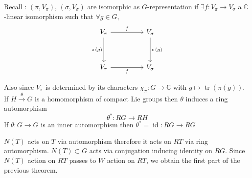 \documentclass[11pt,a4paper]{scrarticle}
\theoremstyle{definition}
\theoremstyle{greenbox}
\newcommand{\C}{\mathbb{C}}
\begin{document}
 Recall : $ (\pi, V_{\pi}) $, $ (\sigma, V_{\sigma}) $ are isomorphic as $ G $-representation if $ \exists f : V_{\pi} \to V_{\sigma} $ a $ \C $-linear isomorphism such that $ \forall g \in G $, 
\[\begin{tikzcd}
	{V_{\pi}} && {V_{\sigma}} \\
	\\
	{V_{\pi}} && {V_{\sigma}}
	\arrow["f", from=1-1, to=1-3]
	\arrow["{\sigma(g)}", from=1-3, to=3-3]
	\arrow["f"', from=3-1, to=3-3]
	\arrow["{\pi(g)}"', from=1-1, to=3-1]
\end{tikzcd}\]

Also since $ V_{\pi} $ is determined by its characters $ \chi_{\pi}: G \to \C $ with $ g \mapsto \operatorname{tr}(\pi(g)) $. If $ H \xrightarrow{\theta} G $ is a homomorphism of compact Lie groups then $ \theta $ induces a ring automorphism 
\[ \theta^{*} : RG \to RH \]
If $ \theta : G \to G $ is an inner automorphism then $ \theta^{*} = \operatorname{id}_{} : RG \to RG$


$ N(T) $ acts on $ T $ via automorphism therefore it acts on $ RT $ via ring automorphism. $ N(T) \subset G$ acts via conjugation inducing identity on $ RG $. Since $ N(T) $ action on $ RT $ passes to $ W $ action on $ RT $, we obtain the first part of the previous theorem. 
\end{document}
